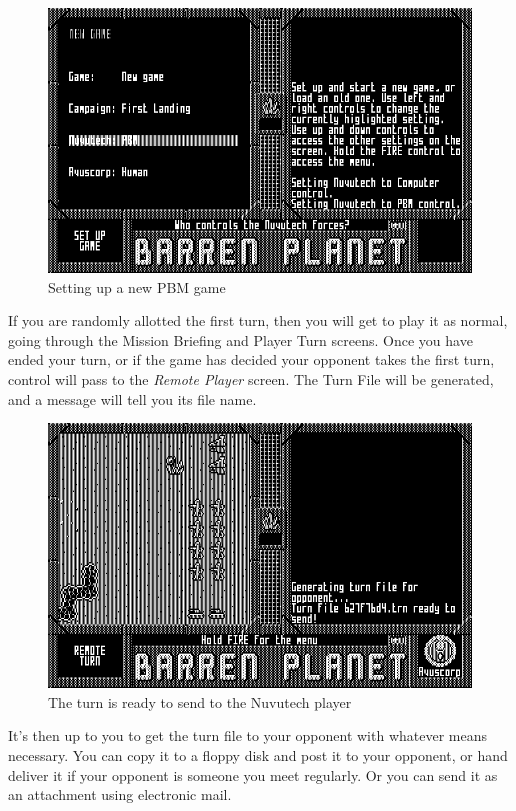\begin{figure}[h]
  \includegraphics[width=\textwidth]{new-pbm}
  \caption{Setting up a new PBM game}
\end{figure}

If you are randomly allotted the first turn, then you will get to play it as normal, going through the Mission Briefing and Player Turn screens. Once you have ended your turn, or if the game has decided your opponent takes the first turn, control will pass to the {\it Remote Player} screen. The Turn File will be generated, and a message will tell you its file name.

\begin{figure}[h]
  \includegraphics[width=\textwidth]{turn-send}
  \caption{The turn is ready to send to the Nuvutech player}
\end{figure}

It's then up to you to get the turn file to your opponent with whatever means necessary. You can copy it to a floppy disk and post it to your opponent, or hand deliver it if your opponent is someone you meet regularly. Or you can send it as an attachment using electronic mail.

